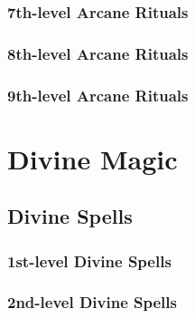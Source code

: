 \subsubsection{7th-level Arcane Rituals}
\begin{rituallist}
    \SLclone[Conj]
    \SLinstantrefuge
    \SLmagnificentmansion
    \SLteleportobject
    \SLcontrolweather[Evoc]
    \SLprogrammedimage
    \SLsequester[Illus]
    \SLsequester[Trans]
\end{rituallist}

\subsubsection{8th-level Arcane Rituals}
\begin{rituallist}
    \SLdiscernlocation
\end{rituallist}

\subsubsection{9th-level Arcane Rituals}
\begin{rituallist}
    \SLemancipation[Abjur]
    \SLantipathy[Ench]
    \SLsympathy
    \SLsoulbind[Vivi]
\end{rituallist}

\section{Divine Magic}\label{Divine Magic}

\subsection{Divine Spells}\label{Divine Spells}

\subsubsection{1st-level Divine Spells}
\begin{spelllist}
    \SLbane
    \SLbless
    \SLcurewounds
    \SLdetectalignment
    \SLentropicshield
    \SLholdperson
    \SLinflictwounds
    \SLprotectionfromalignment
    \SLregeneration
    \SLresistenergy
    \SLresistpoison
    \SLsanctuary
    \SLsummonmonster
\end{spelllist}

\subsubsection{2nd-level Divine Spells}
\begin{spelllist}
    \SLaid
    \SLcurseofbloodandbone
    \SLdiscernlies
    \SLdimensionalanchor
    \SLfreedom
    \SLmarkoftracking
    \SLplanardisruption
    \SLsearinglight
    \SLsharepain
    \SLsilence
    \SLtotemicmind
    \SLtotemicpower
\end{spelllist}

